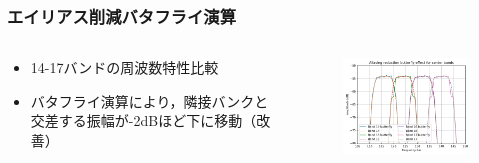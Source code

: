 \documentclass[14pt,xcolor=dvipsnames,table,dvipdfmx]{beamer}
\begin{document}
\begin{frame}[c]
    \frametitle{エイリアス削減バタフライ演算}
    \begin{columns}
        \begin{column}{0.35\textwidth}
            \begin{itemize}
                \item 14-17バンドの周波数特性比較
                \item バタフライ演算により，隣接バンクと交差する振幅が-2dBほど下に移動（改善）
            \end{itemize}
        \end{column}
        \begin{column}{0.7\textwidth}
            \begin{figure}
                \includegraphics[width=85mm]{./figs/MP3_aliasing_reduction_butterfly_focusbands.pdf}
            \end{figure}
        \end{column}
    \end{columns}
\end{frame}
\end{document}
